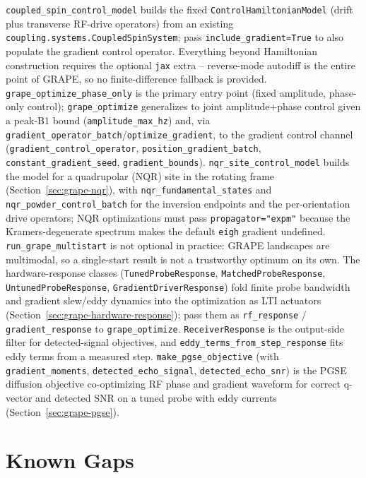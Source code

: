 \documentclass[11pt,oneside]{report}
\newcommand{\code}[1]{\texttt{#1}}
\begin{document}
\code{coupled\_spin\_control\_model} builds the fixed
\code{ControlHamiltonianModel} (drift plus transverse RF-drive operators)
from an existing \code{coupling.systems.CoupledSpinSystem}; pass
\code{include\_gradient=True} to also populate the gradient control operator.
Everything beyond Hamiltonian construction requires the optional \code{jax}
extra -- reverse-mode autodiff is the entire point of GRAPE, so no
finite-difference fallback is provided. \code{grape\_optimize\_phase\_only} is
the primary entry point (fixed amplitude, phase-only control);
\code{grape\_optimize} generalizes to joint amplitude+phase control given a
peak-B1 bound (\code{amplitude\_max\_hz}) and, via
\code{gradient\_operator\_batch}/\code{optimize\_gradient}, to the gradient
control channel (\code{gradient\_control\_operator},
\code{position\_gradient\_batch}, \code{constant\_gradient\_seed},
\code{gradient\_bounds}). \code{nqr\_site\_control\_model} builds the model for a
quadrupolar (NQR) site in the rotating frame (Section~\ref{sec:grape-nqr}), with
\code{nqr\_fundamental\_states} and \code{nqr\_powder\_control\_batch} for the
inversion endpoints and the per-orientation drive operators; NQR optimizations
must pass \code{propagator="expm"} because the Kramers-degenerate spectrum makes
the default \code{eigh} gradient undefined. \code{run\_grape\_multistart} is not
optional in practice: GRAPE landscapes are multimodal, so a single-start result
is not a trustworthy optimum on its own. The hardware-response classes
(\code{TunedProbeResponse}, \code{MatchedProbeResponse},
\code{UntunedProbeResponse}, \code{GradientDriverResponse}) fold finite probe
bandwidth and gradient slew/eddy dynamics into the optimization as LTI actuators
(Section~\ref{sec:grape-hardware-response}); pass them as \code{rf\_response} /
\code{gradient\_response} to \code{grape\_optimize}. \code{ReceiverResponse} is
the output-side filter for detected-signal objectives, and
\code{eddy\_terms\_from\_step\_response} fits eddy terms from a measured step.
\code{make\_pgse\_objective} (with \code{gradient\_moments},
\code{detected\_echo\_signal}, \code{detected\_echo\_snr}) is the PGSE diffusion
objective co-optimizing RF phase and gradient waveform for correct q-vector and
detected SNR on a tuned probe with eddy currents (Section~\ref{sec:grape-pgse}).

\chapter{Known Gaps}
\end{document}
